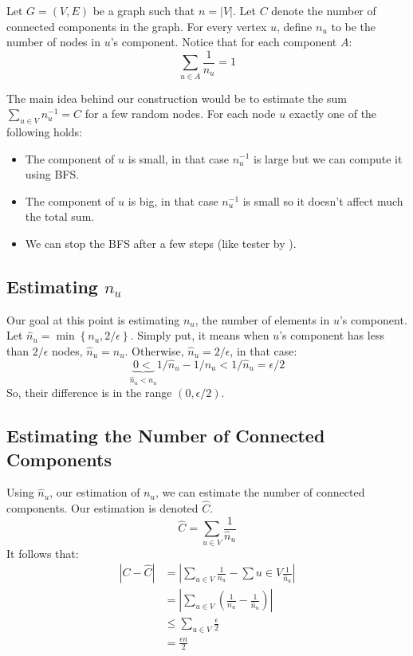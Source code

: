 Let $G=(V,E)$ be a graph such that $n=|V|$.
Let $C$ denote the number of connected components in the graph.
For every vertex $u$, define $n_u$ to be the number of nodes in $u$'s component. Notice that for each component $A$:
$$\sum_{u\in A}\frac{1}{n_u} = 1 $$

The main idea behind our construction would be to estimate the sum $\sum_{u\in V} n_u^{-1} = C$ for a few random nodes. For each node $u$ exactly one of the following holds:
\begin{itemize}
    \item The component of $u$ is small, in that case $n_u^{-1}$ is large but we can compute it using BFS.
    \item The component of $u$ is big, in that case $n_u^{-1}$ is small so it doesn't affect much the total sum.
    \item We can stop the BFS after a few steps (like tester by \cite{goldreich1997property}).
\end{itemize}

\subsection{Estimating $n_u$}

Our goal at this point is estimating $n_u$, the number of elements in $u$'s component.
Let $\hat{n}_u = \min\left\{n_u, 2/\epsilon\right\}$. Simply put, it means when $u$'s component has less than $2/\epsilon$ nodes, $\hat{n}_u = n_u$.
Otherwise, $\hat{n}_u = 2/\epsilon$, in that case:
$$ \underbrace{0 <}_{\hat{n}_u < n_u} 1/{\hat{n}_u} - 1/{n_u}< 1/{\hat{n}_u} = \epsilon/2 $$
So, their difference is in the range $\left(0, \epsilon/2\right)$.

\subsection{Estimating the Number of Connected Components}

Using $\hat{n}_u$, our estimation of $n_u$, we can estimate the number of connected components. 
Our estimation is denoted $\hat{C}$.
\[
    \hat{C} = \sum_{u \in V}\frac{1}{\hat{n}_u}
\]
It follows that:
\[
\begin{aligned}
|C - \hat{C}| &= \left| \sum_{u \in V} \frac{1}{n_u} - \sum{u \in V}\frac{1}{\hat{n}_u}\right| \\
&= \left| \sum_{u\in V} \left(\frac{1}{n_u} - \frac{1}{\hat{n}_n}\right) \right| \\ 
&\leq \sum_{u \in V }\frac{\epsilon}{2} \\
&= \frac{\epsilon n}{2}
\end{aligned}
\]

